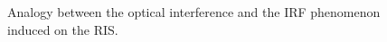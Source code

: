 \documentclass[journal,twocolumn]{IEEEtran}
\theoremstyle{nonumberplain}
\begin{document}
    \else 
        \begin{figure}[t]
            \centering
            \caption{Analogy between the optical interference and the \ac{IRF} phenomenon induced on the RIS.}
            \label{fig:scheme}
        \end{figure}
    \fi
\end{document}

